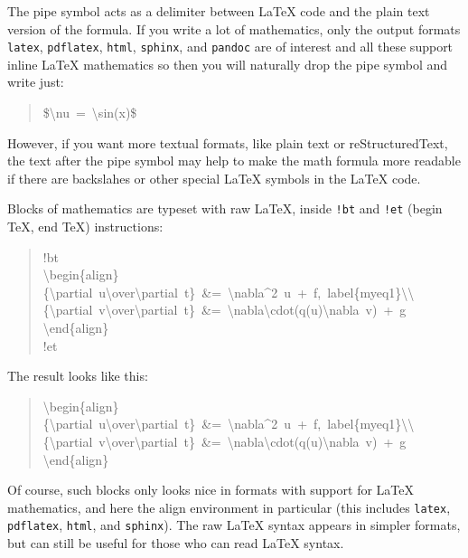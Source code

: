 \documentclass[a4paper]{article}
\begin{document}
The pipe symbol acts as a delimiter between LaTeX code and the plain text
version of the formula. If you write a lot of mathematics, only the
output formats \texttt{latex}, \texttt{pdflatex}, \texttt{html}, \texttt{sphinx}, and \texttt{pandoc}
are of interest
and all these support inline LaTeX mathematics so then you will naturally
drop the pipe symbol and write just:
%
\begin{quote}{\ttfamily \raggedright \noindent
\$\textbackslash{}nu~=~\textbackslash{}sin(x)\$
}
\end{quote}

However, if you want more textual formats, like plain text or reStructuredText,
the text after the pipe symbol may help to make the math formula more readable
if there are backslahes or other special LaTeX symbols in the LaTeX code.

Blocks of mathematics are typeset with raw LaTeX, inside
\texttt{!bt} and \texttt{!et} (begin TeX, end TeX) instructions:
%
\begin{quote}{\ttfamily \raggedright \noindent
!bt\\
\textbackslash{}begin\{align\}\\
\{\textbackslash{}partial~u\textbackslash{}over\textbackslash{}partial~t\}~\&=~\textbackslash{}nabla\textasciicircum{}2~u~+~f,~label\{myeq1\}\textbackslash{}\textbackslash{}\\
\{\textbackslash{}partial~v\textbackslash{}over\textbackslash{}partial~t\}~\&=~\textbackslash{}nabla\textbackslash{}cdot(q(u)\textbackslash{}nabla~v)~+~g\\
\textbackslash{}end\{align\}\\
!et
}
\end{quote}

The result looks like this:
%
\begin{quote}{\ttfamily \raggedright \noindent
\textbackslash{}begin\{align\}\\
\{\textbackslash{}partial~u\textbackslash{}over\textbackslash{}partial~t\}~\&=~\textbackslash{}nabla\textasciicircum{}2~u~+~f,~label\{myeq1\}\textbackslash{}\textbackslash{}\\
\{\textbackslash{}partial~v\textbackslash{}over\textbackslash{}partial~t\}~\&=~\textbackslash{}nabla\textbackslash{}cdot(q(u)\textbackslash{}nabla~v)~+~g\\
\textbackslash{}end\{align\}
}
\end{quote}

Of course, such blocks only looks nice in formats with support
for LaTeX mathematics, and here the align environment in particular
(this includes \texttt{latex}, \texttt{pdflatex}, \texttt{html}, and \texttt{sphinx}). The raw
LaTeX syntax appears in simpler formats, but can still be useful
for those who can read LaTeX syntax.
\end{document}
